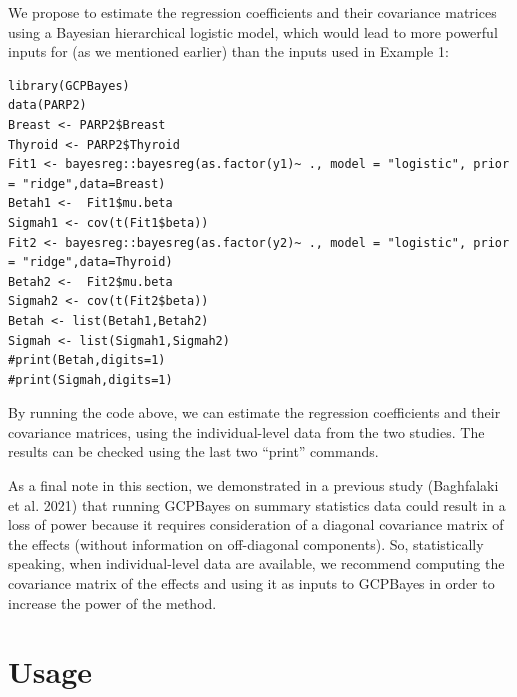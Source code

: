 We propose to estimate the regression coefficients and their covariance matrices using a Bayesian hierarchical logistic model, which would lead to more powerful inputs for  (as we mentioned earlier) than the inputs used in Example 1:

\begin{verbatim}
library(GCPBayes)
data(PARP2)
Breast <- PARP2$Breast
Thyroid <- PARP2$Thyroid
Fit1 <- bayesreg::bayesreg(as.factor(y1)~ ., model = "logistic", prior = "ridge",data=Breast)
Betah1 <-  Fit1$mu.beta
Sigmah1 <- cov(t(Fit1$beta))
Fit2 <- bayesreg::bayesreg(as.factor(y2)~ ., model = "logistic", prior = "ridge",data=Thyroid)
Betah2 <-  Fit2$mu.beta
Sigmah2 <- cov(t(Fit2$beta))
Betah <- list(Betah1,Betah2)
Sigmah <- list(Sigmah1,Sigmah2)
#print(Betah,digits=1)
#print(Sigmah,digits=1)
\end{verbatim}

By running the code above, we can estimate the regression coefficients and their covariance matrices, using the individual-level data from the two studies. The results can be checked using the last two ``print'' commands.

As a final note in this section, we demonstrated in a previous study (Baghfalaki et al. 2021) that running GCPBayes on summary statistics data could result in a loss of power because it requires consideration of a diagonal covariance matrix of the effects (without information on off-diagonal components). So, statistically speaking, when individual-level data are available, we recommend computing the covariance matrix of the effects and using it as inputs to GCPBayes in order to increase the power of the method.

\hypertarget{usage}{%
\section{Usage}\label{usage}}


